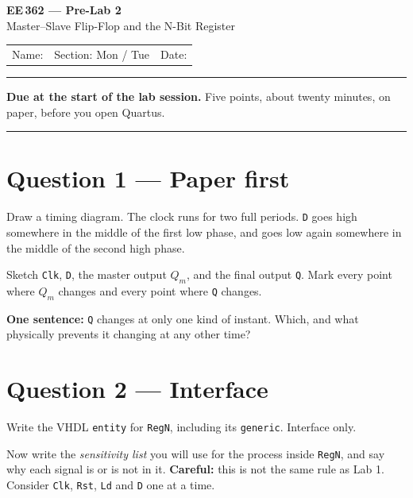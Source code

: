 \documentclass[11pt]{article}
\newcommand{\code}[1]{\texttt{#1}}
\newcommand{\answerbox}[1]{\vspace{2pt}\fbox{\parbox[c][#1][c]{\dimexpr\linewidth-2\fboxsep-2\fboxrule}{\ }}\vspace{4pt}}
\begin{document}
\begin{center}
{\Large\bfseries EE\,362 --- Pre-Lab 2}\\[2pt]
{\large Master--Slave Flip-Flop and the N-Bit Register}\\[6pt]
\begin{tabular}{@{}p{6.5cm}p{4cm}p{4cm}@{}}
Name: \hrulefill & Section: Mon / Tue & Date: \hrulefill
\end{tabular}
\end{center}

\vspace{2pt}\hrule\vspace{4pt}

{\small\textbf{Due at the start of the lab session.} Five points, about twenty
minutes, on paper, before you open Quartus.}

\vspace{4pt}\hrule

\section*{Question 1 --- Paper first}

Draw a timing diagram. The clock runs for two full periods. \code{D} goes high
somewhere in the middle of the first low phase, and goes low again somewhere in
the middle of the second high phase.

Sketch \code{Clk}, \code{D}, the master output $Q_m$, and the final output
\code{Q}. Mark every point where $Q_m$ changes and every point where \code{Q}
changes.

\answerbox{5.2cm}

\textbf{One sentence:} \code{Q} changes at only one kind of instant. Which, and
what physically prevents it changing at any other time?

\answerbox{1.6cm}

\section*{Question 2 --- Interface}

Write the VHDL \code{entity} for \code{RegN}, including its \code{generic}.
Interface only.

\answerbox{4.4cm}

Now write the \emph{sensitivity list} you will use for the process inside
\code{RegN}, and say why each signal is or is not in it. \textbf{Careful:} this
is not the same rule as Lab 1. Consider \code{Clk}, \code{Rst}, \code{Ld} and
\code{D} one at a time.
\end{document}
